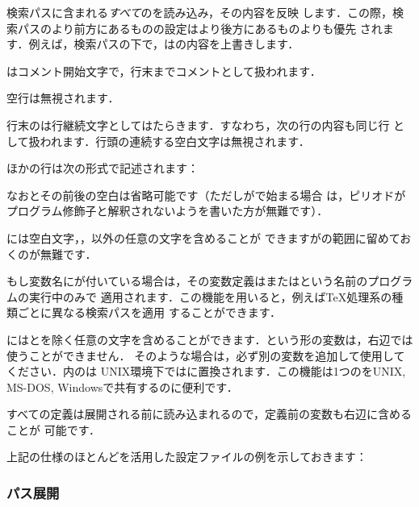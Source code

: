 \documentclass[uplatex,dvipdfmx,tombow]{jsarticle}
\begin{document}
\KPS 検索パスに含まれる\emph{すべて}のを読み込み，その内容を反映
します．この際，検索パスのより前方にあるものの設定はより後方にあるものよりも優先
されます．例えば，検索パスの下で，はの内容を上書きします．

\begin{itemize*}
\item \code{\%}はコメント開始文字で，行末までコメントとして扱われます．
\item 空行は無視されます．
\item 行末の\code{\bs}は行継続文字としてはたらきます．すなわち，次の行の内容も同じ行
  として扱われます．行頭の連続する空白文字は無視されます．
\item ほかの行は次の形式で記述されます：
%
\begin{alltt}
   \optional{=} 
\end{alltt}
%
  なお\samp{=}とその前後の空白は省略可能です（ただしがで始まる場合
  は，ピリオドがプログラム修飾子と解釈されないよう\samp{=}を書いた方が無難です）．
\item {}には空白文字，\samp{=}，以外の任意の文字を含めることが
  できますがの範囲に留めておくのが無難です．
\item もし変数名にが付いている場合は，その変数定義はまたはという名前のプログラムの実行中のみで
  適用されます．この機能を用いると，例えば\TeX 処理系の種類ごとに異なる検索パスを適用
  することができます．
\item {}には\samp{\%}とを除く任意の文字を含めることができます．という形の変数は，右辺では使うことができません．
  そのような場合は，必ず別の変数を追加して使用してください．内の\samp{;}は
  UNIX環境下では\samp{:}に置換されます．この機能は1つのをUNIX, MS-DOS,
  Windowsで共有するのに便利です．
\item すべての定義は展開される前に読み込まれるので，定義前の変数も右辺に含めることが
  可能です．
\end{itemize*}
%
上記の仕様のほとんどを活用した設定ファイルの例を示しておきます：
%


\subsubsection{パス展開}
\label{sec:path-expansion}
\end{document}
